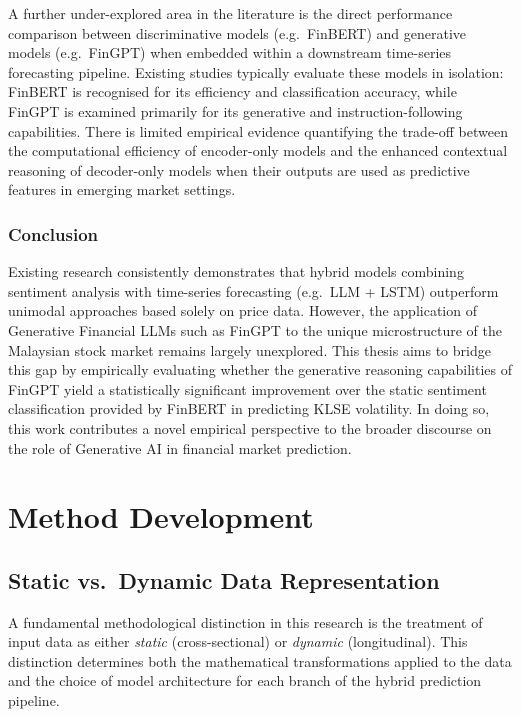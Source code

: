 \documentclass[singlespace]{ucetd}
\begin{document}
A further under-explored area in the literature is the direct performance comparison between discriminative models (e.g.\ FinBERT) and generative models (e.g.\ FinGPT) when embedded within a downstream time-series forecasting pipeline. Existing studies typically evaluate these models in isolation: FinBERT is recognised for its efficiency and classification accuracy, while FinGPT is examined primarily for its generative and instruction-following capabilities. There is limited empirical evidence quantifying the trade-off between the computational efficiency of encoder-only models and the enhanced contextual reasoning of decoder-only models when their outputs are used as predictive features in emerging market settings.

\subsubsection{Conclusion}

Existing research consistently demonstrates that hybrid models combining sentiment analysis with time-series forecasting (e.g.\ LLM + LSTM) outperform unimodal approaches based solely on price data. However, the application of Generative Financial LLMs such as FinGPT to the unique microstructure of the Malaysian stock market remains largely unexplored. This thesis aims to bridge this gap by empirically evaluating whether the generative reasoning capabilities of FinGPT yield a statistically significant improvement over the static sentiment classification provided by FinBERT in predicting KLSE volatility. In doing so, this work contributes a novel empirical perspective to the broader discourse on the role of Generative AI in financial market prediction.


\section{Method Development}

\subsection{Static vs.\ Dynamic Data Representation}

A fundamental methodological distinction in this research is the treatment of input data as either \emph{static} (cross-sectional) or \emph{dynamic} (longitudinal). This distinction determines both the mathematical transformations applied to the data and the choice of model architecture for each branch of the hybrid prediction pipeline.
\end{document}
